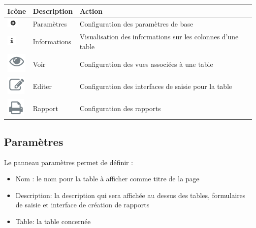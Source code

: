 \documentclass[letterpaper,10pt,french]{sphinxmanual}
\begin{document}
\begin{tabulary}{\linewidth}{|L|L|L|}
\hline

\textbf{Icône}
 & 
\textbf{Description}
 & 
\textbf{Action}
\\
\hline
\includegraphics{process2.png}
 & 
Paramètres
 & 
Configuration des paramètres de base
\\
\hline
\includegraphics{info2.png}
 & 
Informations
 & 
Visualisation des informations sur les colonnes d'une table
\\
\hline
\includegraphics{preview1.png}
 & 
Voir
 & 
Configuration des vues associées à une table
\\
\hline
\includegraphics{pencil1.png}
 & 
Editer
 & 
Configuration des interfaces de saisie pour la table
\\
\hline
\includegraphics{report1.png}
 & 
Rapport
 & 
Configuration des rapports
\\
\hline\end{tabulary}



\subsection{Paramètres}
\label{tables/infopanel:parametres}\label{tables/infopanel:tables-param}
Le panneau paramètres permet de définir :
\begin{itemize}
\item {} 
Nom : le nom pour la table à afficher comme titre de la page

\item {} 
Description: la description qui sera affichée au dessus des tables, formulaires de saisie et interface de création de rapports

\item {} 
Table: la table concernée

\end{itemize}
\end{document}
